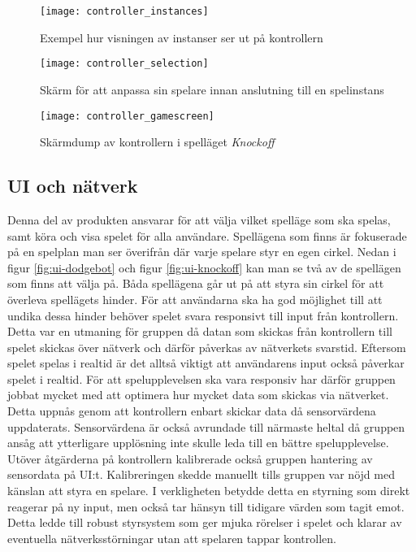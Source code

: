 \begin{figure}[h]
    \centering
    \texttt{[image: controller\_instances]}
    \caption{Exempel hur visningen av instanser ser ut på kontrollern}
    \label{fig:controller_instances}
\end{figure}

\begin{figure}[h]
    \centering
    \texttt{[image: controller\_selection]}
    \caption{Skärm för att anpassa sin spelare innan anslutning till en spelinstans}
    \label{fig:controller_selection}
\end{figure}

\begin{figure}[h]
    \centering
    \texttt{[image: controller\_gamescreen]}
    \caption{Skärmdump av kontrollern i spelläget \textit{Knockoff}}
    \label{fig:controller_gamescreen}
\end{figure}

\subsection{UI och nätverk}
Denna del av produkten ansvarar för att välja vilket spelläge som ska spelas, samt köra och visa spelet för alla användare. Spellägena som finns är fokuserade på en spelplan man ser överifrån där varje spelare styr en egen cirkel. Nedan i figur \ref{fig:ui-dodgebot} och figur \ref{fig:ui-knockoff} kan man se två av de spellägen som finns att välja på. Båda spellägena går ut på att styra sin cirkel för att överleva spellägets hinder. För att användarna ska ha god möjlighet till att undika dessa hinder behöver spelet svara responsivt till input från kontrollern. Detta var en utmaning för gruppen då datan som skickas från kontrollern till spelet skickas över nätverk och därför påverkas av nätverkets svarstid. Eftersom spelet spelas i realtid är det alltså viktigt att användarens input också påverkar spelet i realtid. För att spelupplevelsen ska vara responsiv har därför gruppen jobbat mycket med att optimera hur mycket data som skickas via nätverket. Detta uppnås genom att kontrollern enbart skickar data då sensorvärdena uppdaterats. Sensorvärdena är också avrundade till närmaste heltal då gruppen ansåg att ytterligare upplösning inte skulle leda till en bättre spelupplevelse. Utöver åtgärderna på kontrollern kalibrerade också gruppen hantering av sensordata på UI:t. Kalibreringen skedde manuellt tills gruppen var nöjd med känslan att styra en spelare. I verkligheten betydde detta en styrning som direkt reagerar på ny input, men också tar hänsyn till tidigare värden som tagit emot. Detta ledde till robust styrsystem som ger mjuka rörelser i spelet och klarar av eventuella nätverksstörningar utan att spelaren tappar kontrollen. 


